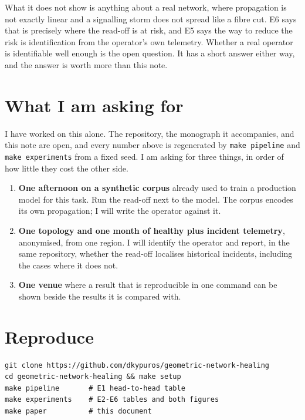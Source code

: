 \documentclass[11pt,a4paper]{article}
\newcommand{\code}[1]{\texttt{#1}}
\begin{document}
What it does not show is anything about a real network, where propagation is not exactly linear
and a signalling storm does not spread like a fibre cut. E6 says that is precisely where the
read-off is at risk, and E5 says the way to reduce the risk is identification from the operator's
own telemetry. Whether a real operator is identifiable well enough is the open question. It has a
short answer either way, and the answer is worth more than this note.

\section{What I am asking for}
I have worked on this alone. The repository, the monograph it accompanies, and this note are open,
and every number above is regenerated by \code{make pipeline} and \code{make experiments} from a
fixed seed. I am asking for three things, in order of how little they cost the other side.
\begin{enumerate}[nosep]
  \item \textbf{One afternoon on a synthetic corpus} already used to train a production model for
  this task. Run the read-off next to the model. The corpus encodes its own propagation; I will
  write the operator against it.
  \item \textbf{One topology and one month of healthy plus incident telemetry}, anonymised, from one
  region. I will identify the operator and report, in the same repository, whether the read-off
  localises historical incidents, including the cases where it does not.
  \item \textbf{One venue} where a result that is reproducible in one command can be shown beside
  the results it is compared with.
\end{enumerate}

\section*{Reproduce}
\begin{verbatim}
git clone https://github.com/dkypuros/geometric-network-healing
cd geometric-network-healing && make setup
make pipeline       # E1 head-to-head table
make experiments    # E2-E6 tables and both figures
make paper          # this document
\end{verbatim}
\end{document}
